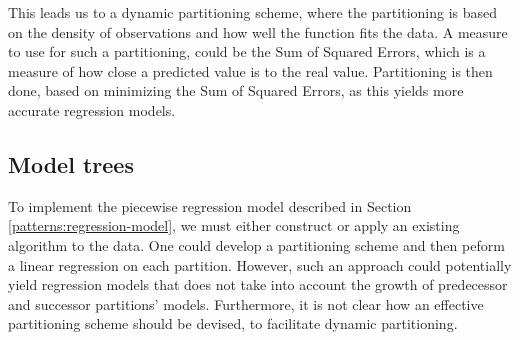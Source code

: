 This leads us to a dynamic partitioning scheme, where the partitioning is based on the density of observations and how well the function fits the data. A measure to use for such a partitioning, could be the Sum of Squared Errors, which is a measure of how close a predicted value is to the real value. Partitioning is then done, based on minimizing the Sum of Squared Errors, as this yields more accurate regression models.



\subsection{Model trees}\label{patterns:weka}
To implement the piecewise regression model described in Section \ref{patterns:regression-model}, we must either construct or apply an existing algorithm to the data. One could develop a partitioning scheme and then peform a linear regression on each partition. However, such an approach could potentially yield regression models that does not take into account the growth of predecessor and successor partitions' models. Furthermore, it is not clear how an effective partitioning scheme should be devised, to facilitate dynamic partitioning.

